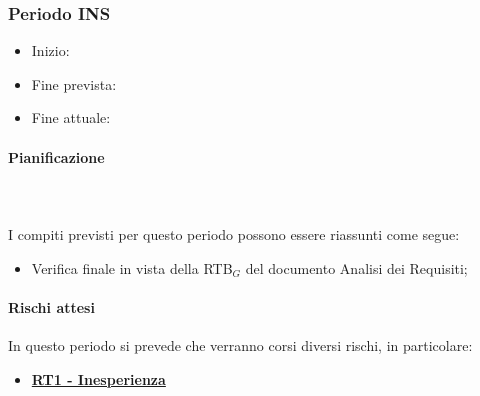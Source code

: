 \subsubsection{Periodo INS}

\begin{itemize}
    \item Inizio: 
    \item Fine prevista: 
    \item Fine attuale: 
\end{itemize}
\paragraph{Pianificazione} \hspace{1cm}
\\ \hspace{1cm} \\

I compiti previsti per questo periodo possono essere riassunti come segue:  
\begin{itemize}
    \item Verifica finale in vista della RTB$_G$ del documento Analisi dei Requisiti;
    
    
\end{itemize}

\paragraph{Rischi attesi}  
In questo periodo si prevede che verranno corsi diversi rischi, in particolare:
\begin{itemize}
    \item \textbf{\hyperlink{RT1}{RT1 - Inesperienza}}
   
\end{itemize}

